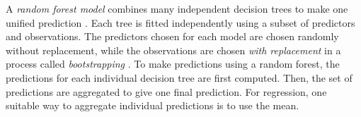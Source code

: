 \documentclass[final,onefignum,onetabnum]{siuro210301}
\begin{document}
	

	
	A \textit{random forest model} combines many independent decision trees to make one unified prediction \cite{breiman2001random}. Each tree is fitted independently using a subset of predictors and observations. The predictors chosen for each model are chosen randomly without replacement, while the observations are chosen \textit{with replacement} in a process called \textit{bootstrapping} \cite{efron1994introduction}. To make predictions using a random forest, the predictions for each individual decision tree are first computed. Then, the set of predictions are aggregated to give one final prediction. For regression, one suitable way to aggregate individual predictions is to use the mean.
	
\end{document}
